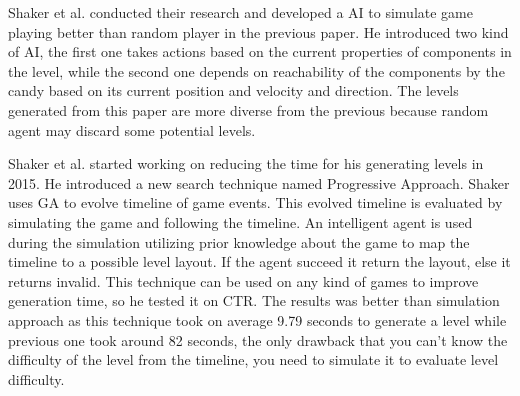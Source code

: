 Shaker et al.\cite{ctrSimulationApproach} conducted their research and developed a AI to simulate game playing better than random player in the previous paper\cite{ctrAutomaticGeneration}. He introduced two kind of AI, the first one takes actions based on the current properties of components in the level, while the second one depends on reachability of the components by the candy based on its current position and velocity and direction. The levels generated from this paper are more diverse from the previous because random agent may discard some potential levels.\\\par

Shaker et al.\cite{ctrProgressiveApproach} started working on reducing the time for his generating levels in 2015. He introduced a new search technique named Progressive Approach. Shaker uses GA to evolve timeline of game events. This evolved timeline is evaluated by simulating the game and following the timeline. An intelligent agent is used during the simulation utilizing prior knowledge about the game to map the timeline to a possible level layout. If the agent succeed it return the layout, else it returns invalid. This technique can be used on any kind of games to improve generation time, so he tested it on CTR. The results was better than simulation approach as this technique took on average 9.79 seconds to generate a level while previous one \cite{ctrSimulationApproach} took around 82 seconds, the only drawback that you can't know the difficulty of the level from the timeline, you need to simulate it to evaluate level difficulty.\\\par


